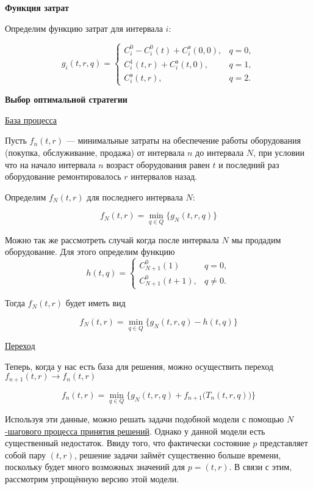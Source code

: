 \bigskip

\textbf{Функция затрат}

Определим функцию затрат для интервала $i$:

\[
g_i(t, r, q) = 
\begin{cases}
	C_i^0 - C_i^0(t) + C_i^\text{э} (0,0), & q = 0, \\
	C_i^1(t,r) + C_i^\text{э} (t,0), & q = 1, \\
	C_i^\text{э} (t,r), & q = 2.
\end{cases}
\]

\textbf{Выбор оптимальной стратегии}

\underline{База процесса}

Пусть $f_n(t, r)$ --- минимальные затраты на обеспечение работы оборудования (покупка, обслуживание, продажа) от интервала $n$ до интервала $N$, при условии что на начало интервала $n$ возраст оборудования равен $t$ и последний раз оборудование ремонтировалось $r$ интервалов назад.

Определим $f_N(t, r)$ для последнего интервала $N$:

\[
\boxed{ f_N(t,r) = \min_{q \in Q} \Big\{ g_N(t,r,q) \Big\} }
\]

Можно так же рассмотреть случай когда после интервала $N$ мы продадим оборудование. Для этого определим функцию
\[
h(t, q) = \begin{cases}
	C_{N+1}^0 (1) & q = 0, \\
	C_{N+1}^0 (t+1), & q \neq 0.
\end{cases}
\]

Тогда $f_N(t, r)$ будет иметь вид

\[
\boxed{ f_N(t,r) = \min_{q \in Q} \Big\{ g_N(t,r, q) - h(t,q) \Big\} }
\]

\bigskip

\underline{Переход}

Теперь, когда у нас есть база для решения, можно осуществить переход $f_{n+1}(t, r) \to f_n(t, r)$

\[
\boxed{ f_n(t,r) = \min_{q \in Q} \Big\{ g_N(t, r, q) + f_{n+1}\big(T_n(t, r, q)\big) \Big\} }
\]

Используя эти данные, можно решать задачи подобной модели с помощью \hyperref[alg:n_step_process]{$N$-шагового процесса принятия решений}. Однако у данной модели есть существенный недостаток. Ввиду того, что фактически состояние $p$ представляет собой пару $(t, r)$, решение задачи займёт существенно больше времени, поскольку будет много возможных значений для $p = (t, r)$. В связи с этим, рассмотрим упрощённую версию этой модели.

